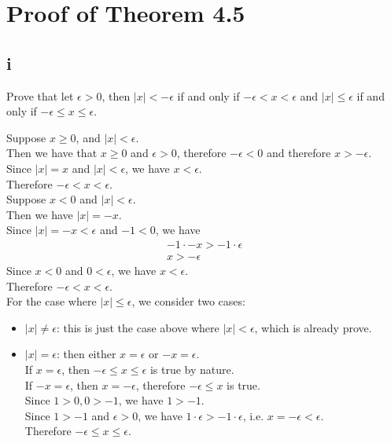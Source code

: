 \documentclass{article}
\begin{document}
\section*{Proof of Theorem 4.5}
\subsection*{i}
Prove that let $\epsilon > 0$, then $|x| < -\epsilon$ if and only if $-\epsilon < x < \epsilon$ and $|x| \leq \epsilon$ if and only if $-\epsilon \leq x \leq \epsilon$.
\begin{addmargin}[1em]{0em}
    Suppose $x \geq 0$, and $|x| < \epsilon$.\\
    Then we have that $x \geq 0$ and $\epsilon > 0$, therefore $-\epsilon < 0$ and therefore $x > -\epsilon$.\\
    Since $|x| = x$ and $|x| < \epsilon$, we have $x < \epsilon$.\\
    Therefore $-\epsilon < x < \epsilon$.\\
    Suppose $x < 0$ and $|x| < \epsilon$.\\
    Then we have $|x| = -x$.\\
    Since $|x| = -x < \epsilon$ and $-1 < 0$, we have
    \begin{equation*}
        \begin{split}
            -1\cdot -x > -1\cdot \epsilon\\
            x > -\epsilon
        \end{split}
    \end{equation*}
    Since $x < 0$ and $0 < \epsilon$, we have $x < \epsilon$.\\
    Therefore $-\epsilon < x < \epsilon$.\\
    For the case where $|x| \leq \epsilon$, we consider two cases:
    \begin{itemize}
        \item $|x| \neq \epsilon$: this is just the case above where $|x| < \epsilon$, which is already prove.
        \item $|x| = \epsilon$: then either $x = \epsilon$ or $-x = \epsilon$.\\
        If $x = \epsilon$, then $-\epsilon \leq x \leq \epsilon$ is true by nature.\\
        If $-x = \epsilon$, then $x = -\epsilon$, therefore $-\epsilon \leq x$ is true.\\
        Since $1 > 0, 0 > -1$, we have $1 > -1$.\\
        Since $1 > -1$ and $\epsilon > 0$, we have $1\cdot \epsilon > -1\cdot \epsilon$, i.e. $x = -\epsilon < \epsilon$.\\
        Therefore $-\epsilon \leq x \leq \epsilon$.
    \end{itemize}
\end{addmargin}
\end{document}
